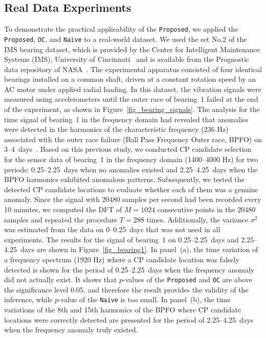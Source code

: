 \subsection{Real Data Experiments}
To demonstrate the practical applicability of the \texttt{Proposed}, we applied the \texttt{Proposed}, \texttt{OC}, and \texttt{Naive} to a real-world dataset.
We used the set No.2 of the IMS bearing dataset, 
which is provided by the Center for Intelligent Maintenance Systems (IMS), University of Cincinnati~\citep{qiu2006wavelet} 
and is available from the Prognostic data repository of NASA~\citep{Lee2007bearing}. 
The experimental apparatus consisted of four identical bearings installed on a common shaft, driven at a constant rotation speed by an AC motor under applied radial loading.
In this dataset, the vibration signals were measured using accelerometers until the outer race of bearing~1 failed at the end of the experiment, 
as shown in Figure~\ref{fig_bearing_signals}. 
The analysis for the time signal of bearing~1 in the frequency domain had revealed that anomalies were detected in the harmonics of the characteristic frequency ($236$ Hz) associated with the outer race failure (Ball Pass Frequency Outer race, BPFO) on 3--4~days~\citep{gousseau2016analysis}. 
Based on this previous study, we conducted CP candidate selection for the sensor data of bearing~1 in the frequency domain (1400--4000 Hz) for two periods: 
0.25--2.25~days when no anomalies existed 
and 2.25--4.25~days when the BPFO harmonics exhibited anomalous patterns. 
Subsequently, we tested the detected CP candidate locations to evaluate whether each of them was a genuine anomaly.
Since the signal with 20480 samples per second had been recorded every 10 minutes, 
we computed the DFT of $M = 1024$ consecutive points in the 20480 samples and repeated the procedure $T = 288$ times. %
Additionally, the variance $\sigma^2$ was estimated from the data on 0--0.25~days that was not used in all experiments.
The results for the signal of bearing~1 on 0.25--2.25~days and 2.25--4.25~days are shown in Figure~\ref{fig_bearing1}.
In panel~(a), the time variation of a frequency spectrum (1920 Hz) where a CP candidate location was falsely detected is shown for the period of 0.25--2.25~days when the frequency anomaly did not actually exist. 
It shows that $p$-values of the \texttt{Proposed} and \texttt{OC} are above the significance level $0.05$, 
and therefore the result provides the validity of the inference, 
while $p$-value of the \texttt{Naive} is too small. 
In panel~(b), the time variations of the 8th and 15th harmonics of the BPFO where CP candidate locations were correctly detected are presented for the period of 2.25--4.25~days when the frequency anomaly truly existed.
